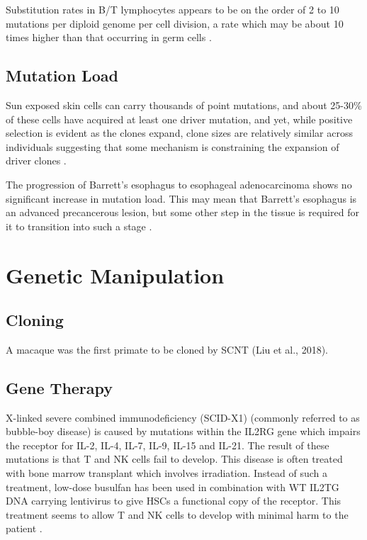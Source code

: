 \documentclass[]{book}
\begin{document}
Substitution rates in B/T lymphocytes appears to be on the order of 2 to
10 mutations per diploid genome per cell division, a rate which may be
about 10 times higher than that occurring in germ cells
\citep{lynch2010rate}.

\subsection{Mutation Load}\label{mutation-load}

Sun exposed skin cells can carry thousands of point mutations, and about
25-30\% of these cells have acquired at least one driver mutation, and
yet, while positive selection is evident as the clones expand, clone
sizes are relatively similar across individuals suggesting that some
mechanism is constraining the expansion of driver clones
\citep{martincorena2015somatic}.

The progression of Barrett's esophagus to esophageal adenocarcinoma
shows no significant increase in mutation load. This may mean that
Barrett's esophagus is an advanced precancerous lesion, but some other
step in the tissue is required for it to transition into such a stage
\citep{gusev2014partitioning}.

\section{Genetic Manipulation}\label{genetic-manipulation}

\subsection{Cloning}\label{cloning}

A macaque was the first primate to be cloned by SCNT (Liu et al., 2018).

\subsection{Gene Therapy}\label{gene-therapy}

X-linked severe combined immunodeficiency (SCID-X1) (commonly referred
to as bubble-boy disease) is caused by mutations within the IL2RG gene
which impairs the receptor for IL-2, IL-4, IL-7, IL-9, IL-15 and IL-21.
The result of these mutations is that T and NK cells fail to develop.
This disease is often treated with bone marrow transplant which involves
irradiation. Instead of such a treatment, low-dose busulfan has been
used in combination with WT IL2TG DNA carrying lentivirus to give HSCs a
functional copy of the receptor. This treatment seems to allow T and NK
cells to develop with minimal harm to the patient
\citep{Mamcarz2019-ei}.
\end{document}
